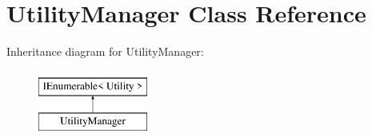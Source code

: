 \hypertarget{class_utility_manager}{}\section{Utility\+Manager Class Reference}
\label{class_utility_manager}
Inheritance diagram for Utility\+Manager\+:\begin{figure}[H]
\begin{center}
\leavevmode
\includegraphics[height=2.000000cm]{class_utility_manager}
\end{center}
\end{figure}
